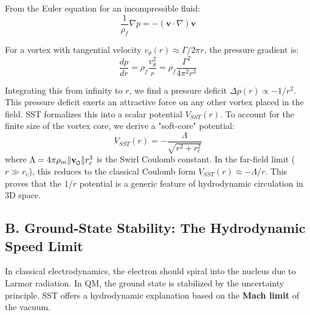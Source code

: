\documentclass[11pt]{article}
\newcommand{\vswirl}{\mathbf{v}_{\mkern-2mu\scriptscriptstyle\boldsymbol{\circlearrowleft}}}
\begin{document}
From the Euler equation for an incompressible fluid:
\begin{equation}
\frac{1}{\rho_f} \nabla p = - (\mathbf{v} \cdot \nabla) \mathbf{v}
\end{equation}

For a vortex with tangential velocity $v_\theta(r) \approx \Gamma / 2\pi r$, the pressure gradient is:
\begin{equation}
\frac{dp}{dr} = \rho_f \frac{v_\theta^2}{r} = \rho_f \frac{\Gamma^2}{4\pi^2 r^3}
\end{equation}

Integrating this from infinity to $r$, we find a pressure deficit $\Delta p(r) \propto -1/r^2$. This pressure deficit exerts an attractive force on any other vortex placed in the field. SST formalizes this into a scalar potential $V_{SST}(r)$. To account for the finite size of the vortex core, we derive a "soft-core" potential:
\begin{equation}
V_{SST}(r) = - \frac{\Lambda}{\sqrt{r^2 + r_c^2}}
\end{equation}
where $\Lambda = 4\pi \rho_m \|\vswirl\| r_c^3$ is the Swirl Coulomb constant. In the far-field limit ($r \gg r_c$), this reduces to the classical Coulomb form $V_{SST}(r) \approx -\Lambda/r$. This proves that the $1/r$ potential is a generic feature of hydrodynamic circulation in 3D space.

\subsection*{B. Ground-State Stability: The Hydrodynamic Speed Limit}
In classical electrodynamics, the electron should spiral into the nucleus due to Larmor radiation. In QM, the ground state is stabilized by the uncertainty principle. SST offers a hydrodynamic explanation based on the \textbf{Mach limit} of the vacuum.
\end{document}
